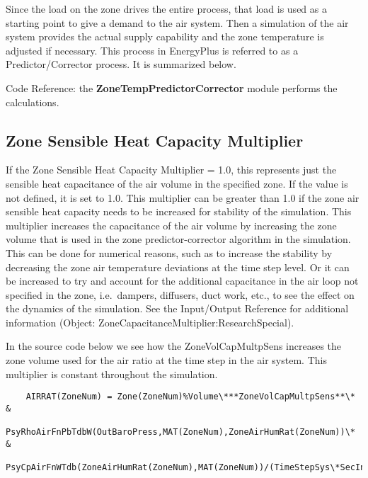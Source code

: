 Since the load on the zone drives the entire process, that load is used as a starting point to give a demand to the air system. Then a simulation of the air system provides the actual supply capability and the zone temperature is adjusted if necessary. This process in EnergyPlus is referred to as a Predictor/Corrector process. It is summarized below.

Code Reference: the \textbf{ZoneTempPredictorCorrector} module performs the calculations.

\subsection{Zone Sensible Heat Capacity Multiplier}\label{zone-sensible-heat-capacity-multiplier}

If the Zone Sensible Heat Capacity Multiplier = 1.0, this represents just the sensible heat capacitance of the air volume in the specified zone. If the value is not defined, it is set to 1.0. This multiplier can be greater than 1.0 if the zone air sensible heat capacity needs to be increased for stability of the simulation. This multiplier increases the capacitance of the air volume by increasing the zone volume that is used in the zone predictor-corrector algorithm in the simulation. This can be done for numerical reasons, such as to increase the stability by decreasing the zone air temperature deviations at the time step level. Or it can be increased to try and account for the additional capacitance in the air loop not specified in the zone, i.e.~dampers, diffusers, duct work, etc., to see the effect on the dynamics of the simulation. See the Input/Output Reference for additional information (Object: ZoneCapacitanceMultiplier:ResearchSpecial).

In the source code below we see how the ZoneVolCapMultpSens increases the zone volume used for the air ratio at the time step in the air system. This multiplier is constant throughout the simulation.

\begin{lstlisting}
    AIRRAT(ZoneNum) = Zone(ZoneNum)%Volume\***ZoneVolCapMultpSens**\* &
               PsyRhoAirFnPbTdbW(OutBaroPress,MAT(ZoneNum),ZoneAirHumRat(ZoneNum))\* &
               PsyCpAirFnWTdb(ZoneAirHumRat(ZoneNum),MAT(ZoneNum))/(TimeStepSys\*SecInHour)
\end{lstlisting}
